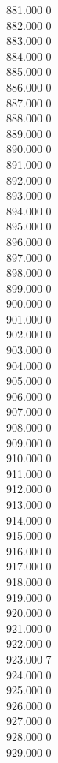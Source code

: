 { 881.000	0 \\
 882.000	0 \\
 883.000	0 \\
 884.000	0 \\
 885.000	0 \\
 886.000	0 \\
 887.000	0 \\
 888.000	0 \\
 889.000	0 \\
 890.000	0 \\
 891.000	0 \\
 892.000	0 \\
 893.000	0 \\
 894.000	0 \\
 895.000	0 \\
 896.000	0 \\
 897.000	0 \\
 898.000	0 \\
 899.000	0 \\
 900.000	0 \\
 901.000	0 \\
 902.000	0 \\
 903.000	0 \\
 904.000	0 \\
 905.000	0 \\
 906.000	0 \\
 907.000	0 \\
 908.000	0 \\
 909.000	0 \\
 910.000	0 \\
 911.000	0 \\
 912.000	0 \\
 913.000	0 \\
 914.000	0 \\
 915.000	0 \\
 916.000	0 \\
 917.000	0 \\
 918.000	0 \\
 919.000	0 \\
 920.000	0 \\
 921.000	0 \\
 922.000	0 \\
 923.000	7 \\
 924.000	0 \\
 925.000	0 \\
 926.000	0 \\
 927.000	0 \\
 928.000	0 \\
 929.000	0 \\
}

